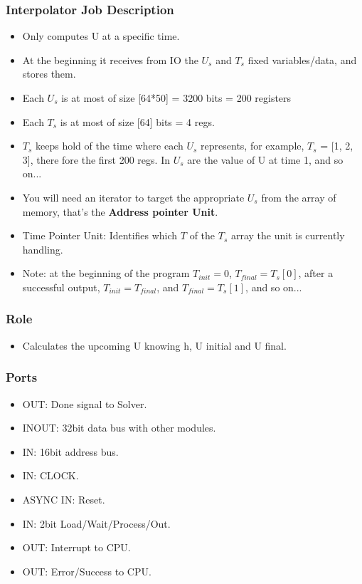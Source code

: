 \documentclass[12pt]{report}
\begin{document}
\subsubsection{Interpolator Job Description}
\begin{itemize}
    \item Only computes U at a specific time.
    \item At the beginning it receives from IO the $U_s$ and $T_s$ fixed variables/data, and stores them.
    \item Each $U_s$ is at most of size [64*50] = 3200 bits = 200 registers
    \item Each $T_s$ is at most of size [64] bits = 4 regs.
    \item $T_s$ keeps hold of the time where each $U_s$ represents, for example, $T_s$ = [1, 2, 3], there fore the first 200 regs. In $U_s$ are the value of U at time 1, and so on... 
    \item You will need an iterator to target the appropriate $U_s$ from the array of memory, that's the \textbf{Address pointer Unit}.
    \item {Time Pointer Unit}: Identifies which $T$ of the $T_s$ array the unit is currently handling.
    \item Note: at the beginning of the program $T_{init} = 0$, $T_{final} = T_s[0]$, after a successful output, $T_{init} = T_{final}$, and $T_{final} = T_s[1]$, and so on...
\end{itemize}

\subsubsection{Role}
\begin{itemize}
    \item Calculates the upcoming U knowing h, U initial and U final.
\end{itemize}

\subsubsection{Ports}
\begin{itemize}
    \item OUT: Done signal to Solver.
    \item INOUT: 32bit data bus with other modules.
    \item IN: 16bit address bus.
    \item IN: CLOCK.
    \item ASYNC IN: Reset.
    \item IN: 2bit Load/Wait/Process/Out.
    \item OUT: Interrupt to CPU.
    \item OUT: Error/Success to CPU.
\end{itemize}
\end{document}
